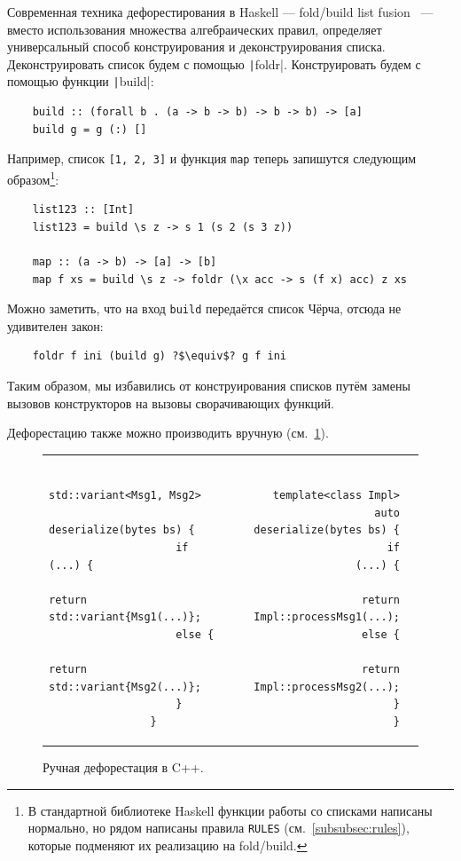 Современная техника дефорестирования в Haskell --- fold/build list fusion~\cite{gill1993short} --- вместо использования множества алгебраических правил, определяет универсальный способ конструирования и деконструирования списка.
Деконструировать список будем с помощью \texttt|foldr|.
Конструировать будем с помощью функции \texttt|build|:
\begin{verbatim}
    build :: (forall b . (a -> b -> b) -> b -> b) -> [a]
    build g = g (:) []
\end{verbatim}
Например, список \texttt{[1, 2, 3]} и функция \texttt{map} теперь запишутся следующим образом\footnote{В стандартной библиотеке Haskell функции работы со списками написаны нормально, но рядом написаны правила \texttt{RULES} (см.~\ref{subsubsec:rules}), которые подменяют их реализацию на fold/build.}:
\begin{verbatim}
    list123 :: [Int]
    list123 = build \s z -> s 1 (s 2 (s 3 z))

    map :: (a -> b) -> [a] -> [b]
    map f xs = build \s z -> foldr (\x acc -> s (f x) acc) z xs
\end{verbatim}
Можно заметить, что на вход \texttt{build} передаётся список Чёрча, отсюда не удивителен закон:
\begin{verbatim}
    foldr f ini (build g) ?$\equiv$? g f ini
\end{verbatim}

Таким образом, мы избавились от конструирования списков путём замены вызовов конструкторов на вызовы сворачивающих функций.

Дефорестацию также можно производить вручную (см.~\ref{fig:cpp-deforestation}).
\begin{figure}
    \centering
    \begin{tabular}{p{} rl}
        \begin{minipage}[t]{0.5\textwidth}
            \begin{verbatim}
                std::variant<Msg1, Msg2>
                    deserialize(bytes bs) {
                    if (...) {
                        return std::variant{Msg1(...)};
                    else {
                        return std::variant{Msg2(...)};
                    }
                }
            \end{verbatim}
        \end{minipage}
        &
        \begin{minipage}[t]{0.5\textwidth}
            \begin{verbatim}
                template<class Impl>
                auto deserialize(bytes bs) {
                    if (...) {
                        return Impl::processMsg1(...);
                    else {
                        return Impl::processMsg2(...);
                    }
                }
            \end{verbatim}
        \end{minipage}
    \end{tabular}
    \caption{Ручная дефорестация в C++.}
    \label{fig:cpp-deforestation}
\end{figure}

